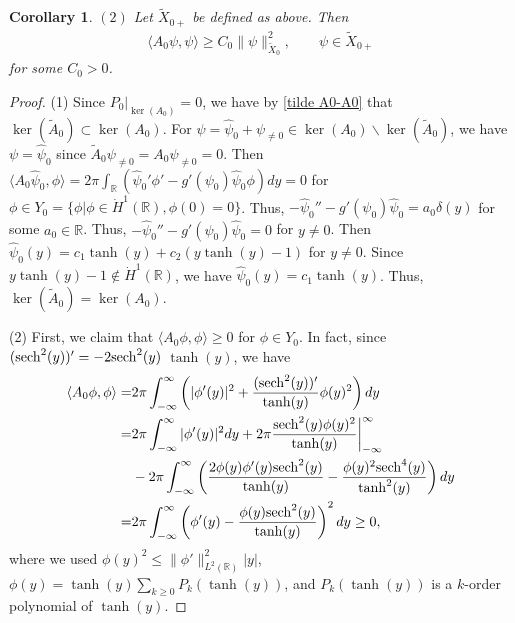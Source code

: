 \documentclass[1 [leqno, 11pt]{amsart}
\numberwithin{equation}{section}
\def\sech{{\rm{sech}}}
\newtheorem{Corollary}[Theorem]{Corollary}
\begin{document}
\begin{CJK*}{GBK}{song}
\begin{Corollary}
$(2)$ Let $\tilde X_{0+}$ be defined as above. Then
\begin{align*}
\langle  A_0 \psi,\psi\rangle \geq C_0 \| \psi\|_{\tilde X_0}^2, \quad \quad \psi\in \tilde X_{0+}
\end{align*}
for some $C_0>0$.
\end{Corollary}
\begin{proof} (1)
Since $P_0|_{\ker ( A_0)}=0$, we have by \eqref{tilde A0-A0} that $\ker (\tilde A_0)\subset \ker ( A_0)$.
For $\psi=\widehat\psi_0+\psi_{\neq0}\in \ker ( A_0)\backslash\ker (\tilde A_0)$, we have $\psi=\widehat\psi_0$ since $\tilde A_0\psi_{\neq0}=A_0\psi_{\neq0}=0$.
Then $\langle A_0 \widehat\psi_0,\phi\rangle=2\pi\int_\mathbb{R}\left(\widehat\psi_0'\phi'-g'(\psi_0)\widehat\psi_0\phi \right)dy=0$ for $\phi\in Y_0=\{\phi|\phi\in\dot{H}^1(\mathbb{R}),\phi(0)=0\}$. Thus,
  $-\widehat\psi_0''-g'(\psi_0)\widehat\psi_0=a_0\delta(y)$ for some  $a_0\in \mathbb{R}$. Thus,  $-\widehat\psi_0''-g'(\psi_0)\widehat\psi_0=0$ for $y\neq0$. Then $\widehat\psi_0(y)=c_1\tanh(y)+c_2(y\tanh(y)-1)$ for $y\neq0$. Since $y\tanh(y)-1\notin \dot{H}^1(\mathbb{R})$, we have $\widehat\psi_0(y)=c_1\tanh(y)$. Thus, $\ker (\tilde A_0)=\ker ( A_0)$.


(2) First, we claim that $\langle A_0\phi,\phi\rangle\geq0$ for $\phi\in Y_0$.
In fact, since $(\sech^2(y))'=-2\sech^2(y)$ $\tanh(y)$, we have
\begin{align*}
\langle A_0\phi,\phi\rangle=&2\pi\int_{-\infty}^\infty\left(|\phi'(y)|^2+{(\sech^2(y))'\over\tanh(y)}\phi(y)^2\right)dy\\
=&2\pi\int_{-\infty}^\infty|\phi'(y)|^2dy+2\pi{\sech^2(y)\phi(y)^2\over\tanh(y)}\bigg|_{-\infty}^\infty\\
&-
2\pi\int_{-\infty}^\infty\left({2\phi(y)\phi'(y)\sech^2(y)\over\tanh(y)}
-{\phi(y)^2\sech^4(y)\over\tanh^2(y)}\right)dy\\
=&2\pi\int_{-\infty}^\infty\left(\phi'(y)
-{\phi(y)\sech^2(y)\over\tanh(y)}\right)^2dy\geq0,
\end{align*}
where we used $\phi(y)^2\leq\|\phi'\|_{L^2(\mathbb{R})}^2|y|$, $\phi(y)=\tanh(y)\sum_{k\geq0}P_k(\tanh(y))$, and $P_k(\tanh(y))$ is a $k$-order polynomial of $\tanh(y)$.


\end{proof}
\end{CJK*}
\end{document}
